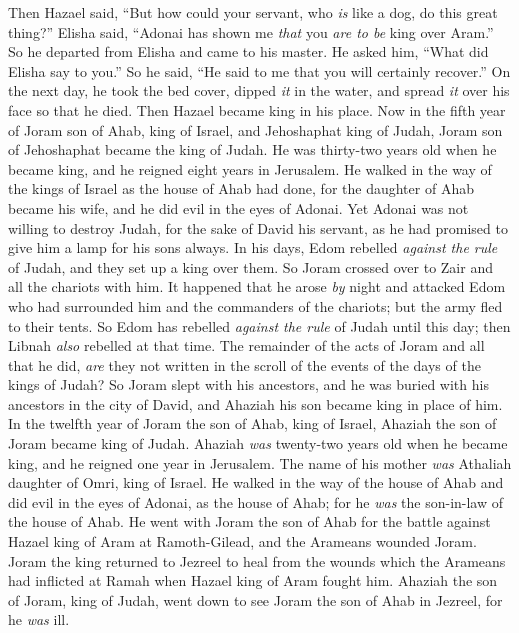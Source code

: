 \begin{biblechapter}
\verse Then Hazael said, “But how could your servant, who \textit{is} like a dog, do this great thing?” Elisha said, “Adonai has shown me \textit{that} you \textit{are to be} king over Aram.”
\verse So he departed from Elisha and came to his master. He asked him, “What did Elisha say to you.” So he said, “He said to me that you will certainly recover.”
\verse On the next day, he took the bed cover, dipped \textit{it} in the water, and spread \textit{it} over his face so that he died. Then Hazael became king in his place.
 Now in the fifth year of Joram son of Ahab, king of Israel, and Jehoshaphat king of Judah, Joram son of Jehoshaphat became the king of Judah.
\verse He was thirty-two years old when he became king, and he reigned eight years in Jerusalem.
\verse He walked in the way of the kings of Israel as the house of Ahab had done, for the daughter of Ahab became his wife, and he did evil in the eyes of Adonai.
\verse Yet Adonai was not willing to destroy Judah, for the sake of David his servant, as he had promised to give him a lamp for his sons always.
\verse In his days, Edom rebelled \textit{against the rule} of Judah, and they set up a king over them.
\verse So Joram crossed over to Zair and all the chariots with him. It happened that he arose \textit{by} night and attacked Edom who had surrounded him and the commanders of the chariots; but the army fled to their tents.
\verse So Edom has rebelled \textit{against the rule} of Judah until this day; then Libnah \textit{also} rebelled at that time.
\verse The remainder of the acts of Joram and all that he did, \textit{are} they not written in the scroll of the events of the days of the kings of Judah?
\verse So Joram slept with his ancestors, and he was buried with his ancestors in the city of David, and Ahaziah his son became king in place of him.
 In the twelfth year of Joram the son of Ahab, king of Israel, Ahaziah the son of Joram became king of Judah.
\verse Ahaziah \textit{was} twenty-two years old when he became king, and he reigned one year in Jerusalem. The name of his mother \textit{was} Athaliah daughter of Omri, king of Israel.
\verse He walked in the way of the house of Ahab and did evil in the eyes of Adonai, as the house of Ahab; for he \textit{was} the son-in-law of the house of Ahab.
\verse He went with Joram the son of Ahab for the battle against Hazael king of Aram at Ramoth-Gilead, and the Arameans wounded Joram.
\verse Joram the king returned to Jezreel to heal from the wounds which the Arameans had inflicted at Ramah when Hazael king of Aram fought him. Ahaziah the son of Joram, king of Judah, went down to see Joram the son of Ahab in Jezreel, for he \textit{was} ill.
\end{biblechapter}

